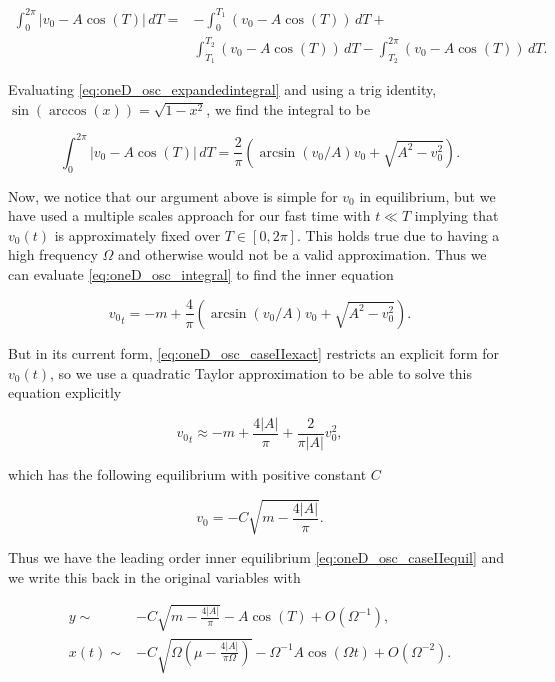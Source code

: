 \begin{equation}\label{eq:oneD_osc_expandedintegral}
\begin{aligned}
\int_0^{2\pi}|v_0-A\cos(T)|\,dT=&-\int_0^{T_1}(v_0-A\cos(T))\,dT+\\
&\int_{T_1}^{T_2}(v_0-A\cos(T))\,dT-\int_{T_2}^{2\pi}(v_0-A\cos(T))\,dT.
\end{aligned}
\end{equation}

Evaluating \eqref{eq:oneD_osc_expandedintegral} and using a trig identity, $\sin(\arccos(x))=\sqrt{1-x^2}$, we find the integral to be

\begin{equation*}
\int_0^{2\pi}|v_0-A\cos(T)|\,dT=\frac{2}{\pi}\left(\arcsin(v_0/A)v_0+\sqrt{A^2-v_0^2}\right).
\end{equation*}

Now, we notice that our argument above is simple for $v_0$ in equilibrium, but we have used a multiple scales approach for our fast time with $t\ll T$ implying that $v_0(t)$ is approximately fixed over $T\in [0,2\pi]$. This holds true due to having a high frequency $\Omega$ and otherwise would not be a valid approximation. Thus we can evaluate \eqref{eq:oneD_osc_integral} to find the inner equation 

\begin{equation}\label{eq:oneD_osc_caseIIexact}
{v_0}_t=-m+\frac{4}{\pi}\left(\arcsin(v_0/A)v_0+\sqrt{A^2-v_0^2}\right).
\end{equation}

But in its current form, \eqref{eq:oneD_osc_caseIIexact} restricts an explicit form for $v_0(t)$, so we use a quadratic Taylor approximation to be able to solve this equation explicitly

\begin{equation}\label{eq:oneD_osc_caseIItaylor}
{v_0}_t \approx -m + \frac{4|A|}{\pi} + \frac{2}{\pi |A|}v_0^2,
\end{equation}

which has the following equilibrium with positive constant $C$

\begin{equation}\label{eq:oneD_osc_caseIIequil}
v_0=-C\sqrt{m-\frac{4|A|}{\pi}}.
\end{equation}

Thus we have the leading order inner equilibrium \eqref{eq:oneD_osc_caseIIequil} and we write this back in the original variables with

\begin{equation}\label{eq:oneD_osc_innersoln}
\begin{aligned}
y\sim& -C\sqrt{m-\frac{4|A|}{\pi}}-A\cos(T)+O(\Omega^{-1}),\\ 
x(t)\sim& -C\sqrt{\Omega \left(\mu-\frac{4|A|}{\pi \Omega}\right)}-\Omega^{-1} A\cos(\Omega t)+O(\Omega^{-2}).
\end{aligned}
\end{equation}

